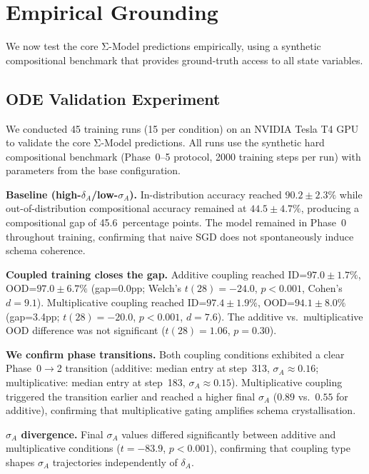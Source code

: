 \documentclass[11pt,a4paper]{article}
\begin{document}
\section{Empirical Grounding}\label{sec:empirical}

We now test the core Σ-Model predictions empirically, using a synthetic compositional benchmark that provides ground-truth access to all state variables.

\subsection{ODE Validation Experiment}\label{sec:ode-exp}

We conducted 45 training runs (15 per condition) on an NVIDIA Tesla T4
GPU to validate the core Σ-Model predictions. All runs use the synthetic
hard compositional benchmark (Phase~0--5 protocol, 2000 training steps
per run) with parameters from the base configuration.

\textbf{Baseline (high-$\delta_A$/low-$\sigma_A$).}
In-distribution accuracy reached $90.2 \pm 2.3\%$ while out-of-distribution
compositional accuracy remained at $44.5 \pm 4.7\%$, producing a
compositional gap of 45.6~percentage points. The model remained in
Phase~0 throughout training, confirming that naive SGD does not
spontaneously induce schema coherence.

\textbf{Coupled training closes the gap.}
Additive coupling reached ID=$97.0 \pm 1.7\%$, OOD=$97.0 \pm 6.7\%$
(gap=0.0pp; Welch's $t(28)=-24.0$, $p<0.001$, Cohen's $d=9.1$).
Multiplicative coupling reached ID=$97.4 \pm 1.9\%$, OOD=$94.1 \pm 8.0\%$
(gap=3.4pp; $t(28)=-20.0$, $p<0.001$, $d=7.6$). The additive vs.\
multiplicative OOD difference was not significant ($t(28)=1.06$,
$p=0.30$).

\textbf{We confirm phase transitions.}
Both coupling conditions exhibited a clear Phase~0$\to$2 transition
(additive: median entry at step~313, $\sigma_A\approx0.16$;
multiplicative: median entry at step~183, $\sigma_A\approx0.15$).
Multiplicative coupling triggered the transition earlier and reached
a higher final $\sigma_A$ ($0.89$ vs.\ $0.55$ for additive), confirming
that multiplicative gating amplifies schema crystallisation.

\textbf{$\sigma_A$ divergence.}
Final $\sigma_A$ values differed significantly between additive and
multiplicative conditions ($t=-83.9$, $p<0.001$), confirming that
coupling type shapes $\sigma_A$ trajectories independently of
$\delta_A$.
\end{document}
